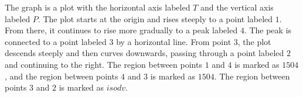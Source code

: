 The graph is a plot with the horizontal axis labeled \( T \) and the vertical axis labeled \( P \). The plot starts at the origin and rises steeply to a point labeled \( 1 \). From there, it continues to rise more gradually to a peak labeled \( 4 \). The peak is connected to a point labeled \( 3 \) by a horizontal line. From point \( 3 \), the plot descends steeply and then curves downwards, passing through a point labeled \( 2 \) and continuing to the right. The region between points \( 1 \) and \( 4 \) is marked as \( 1504 \), and the region between points \( 4 \) and \( 3 \) is marked as \( 1504 \). The region between points \( 3 \) and \( 2 \) is marked as \( isodv \).